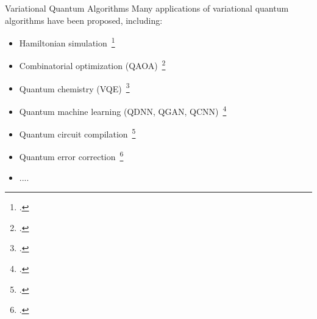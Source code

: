\documentclass[10pt]{beamer}
\begin{document}
\begin{CJK}{UTF8}{gbsn}
\begin{frame}[fragile]{Variational Quantum Algorithms}
 Many applications of variational quantum algorithms have been proposed, including:
  \begin{itemize}
    \item Hamiltonian simulation~\footcite{chen2020demonstration}
    \item Combinatorial optimization (QAOA)~\footcite{farhi2014quantum,moll2018quantum}
    \item Quantum chemistry (VQE)~\footcite{peruzzo2014variational, Kandala2017hardware,li2022toward}
    \item Quantum machine learning (QDNN, QGAN, QCNN)~\footcite{beer2020training,huang2021experimental,havlivcek2019supervised,mitarai2018quantum}
    \item Quantum circuit compilation~\footcite{khatri2019quantum}
    \item Quantum error correction~\footcite{johnson2017qvector,xu2021variational}
    \item ....
  \end{itemize}
  \vspace{1em}
\end{frame}


\end{CJK}
\end{document}
